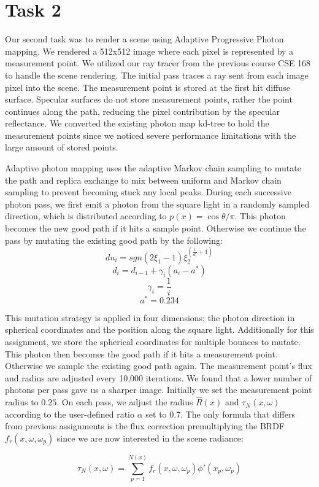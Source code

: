 \section*{Task 2}
Our second task was to render a scene using Adaptive Progressive Photon mapping. We rendered a 512x512 image where each pixel is represented by a measurement point. We utilized our ray tracer from the previous course CSE 168 to handle the scene rendering. The initial pass traces a ray sent from each image pixel into the scene. The measurement point is stored at the first hit diffuse surface. Specular surfaces do not store measurement points, rather the point continues along the path, reducing the pixel contribution by the specular reflectance. We converted the existing photon map kd-tree to hold the measurement points since we noticed severe performance limitations with the large amount of stored points. 

Adaptive photon mapping uses the adaptive Markov chain sampling to mutate the path and replica exchange to mix between uniform and Markov chain sampling to prevent becoming stuck any local peaks. During each successive photon pass, we first emit a photon from the square light in a randomly sampled direction, which is distributed according to $p(x)=\cos \theta/\pi$. This photon becomes the new good path if it hits a sample point. Otherwise we continue the pass by mutating the existing good path by the following:
$$du_i = sgn(2\xi_1 - 1)\xi_2^{(\frac{1}{d_i}+1)}$$
$$d_i = d_{i-1} + \gamma_i(a_i - a^*)$$
$$\gamma_i = \frac{1}{i}$$
$$a^* = 0.234$$

This mutation strategy is applied in four dimensions; the photon direction in spherical coordinates and the position along the square light. Additionally for this assignment, we store the spherical coordinates for multiple bounces to mutate. This photon then becomes the good path if it hits a measurement point. Otherwise we sample the existing good path again. The measurement point's flux and radius are adjusted every 10,000 iterations. We found that a lower number of photons per pass gave us a sharper image. Initially we set the measurement point radius to $0.25$. On each pass, we adjust the radius $ \hat{R}(x) $ and $\tau_N(x, \omega)$ according to the user-defined ratio $ \alpha $ set to 0.7. The only formula that differs from previous assignments is the flux correction premultiplying the BRDF $f_r(x,\omega,\omega_p)$ since we are now interested in the scene radiance:

$$ \tau_N(x, \omega) = \sum_{p=1}^{N(x)} f_r(x,\omega,\omega_p){\phi}'(x_p, \omega_p) $$

